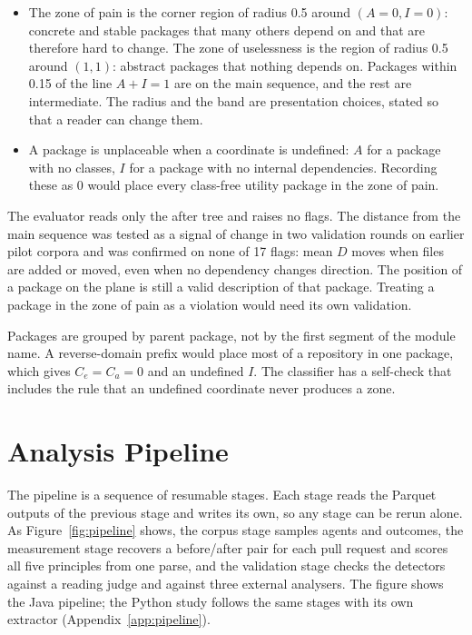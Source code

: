 \begin{itemize}
  \item The zone of pain is the corner region of radius 0.5 around $(A{=}0, I{=}0)$: concrete and
  stable packages that many others depend on and that are therefore hard to change. The zone of
  uselessness is the region of radius 0.5 around $(1,1)$: abstract packages that nothing depends on.
  Packages within 0.15 of the line $A+I=1$ are on the main sequence, and the rest are intermediate.
  The radius and the band are presentation choices, stated so that a reader can change them.
  \item A package is unplaceable when a coordinate is undefined: $A$ for a package with no classes,
  $I$ for a package with no internal dependencies. Recording these as 0 would place every class-free
  utility package in the zone of pain.
\end{itemize}

The evaluator reads only the after tree and raises no flags. The distance from the main sequence was
tested as a signal of change in two validation rounds on earlier pilot corpora and was confirmed on
none of 17 flags: mean $D$ moves when files are added or moved, even when no dependency changes
direction. The position of a package on the plane is still a valid description of that package.
Treating a package in the zone of pain as a violation would need its own validation.

Packages are grouped by parent package, not by the first segment of the module name. A reverse-domain
prefix would place most of a repository in one package, which gives $C_e = C_a = 0$ and an undefined
$I$. The classifier has a self-check that includes the rule that an undefined coordinate never
produces a zone.

\section{Analysis Pipeline}
\label{sec:pipeline}

The pipeline is a sequence of resumable stages. Each stage reads the Parquet outputs of the previous
stage and writes its own, so any stage can be rerun alone. As Figure~\ref{fig:pipeline} shows, the
corpus stage samples agents and outcomes, the measurement stage recovers a before/after pair for
each pull request and scores all five principles from one parse, and the validation stage checks the
detectors against a reading judge and against three external analysers. The figure shows the Java
pipeline; the Python study follows the same stages with its own extractor
(Appendix~\ref{app:pipeline}).

